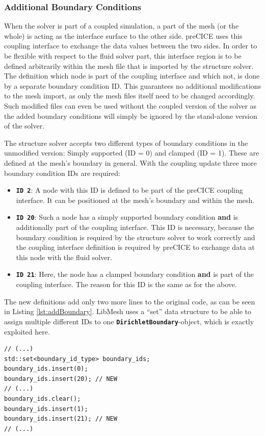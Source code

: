   \subsubsection{Additional Boundary Conditions}\label{sec:Coupl-Impl-BCs}
   When the solver is part of a coupled simulation, a part of the mesh (or the whole) is acting as the interface surface to the other side. preCICE uses this coupling interface to exchange the data values between the two sides. In order to be flexible with respect to the fluid solver part, this interface region is to be defined arbitrarily within the mesh file that is imported by the structure solver. The definition which node is part of the coupling interface and which not, is done by a separate boundary condition ID. This guarantees no additional modifications to the mesh import, as only the mesh files itself need to be changed accordingly. Such modified files can even be used without the coupled version of the solver as the added boundary conditions will simply be ignored by the stand-alone version of the solver.
   
   The structure solver accepts two different types of boundary conditions in the unmodified version: Simply supported (ID = 0) and clamped (ID = 1). These are defined at the mesh's boundary in general. With the coupling update three more boundary condition IDs are required:
   \begin{itemize}
  	\item \textbf{\texttt{ID 2}}: A node with this ID is defined to be part of the preCICE coupling interface. It can be positioned at the mesh's boundary and within the mesh.
  	\item \textbf{\texttt{ID 20}}: Such a node has a simply supported boundary condition \textbf{and} is additionally part of the coupling interface. This ID is necessary, because the boundary condition is required by the structure solver to work correctly and the coupling interface definition is required by preCICE to exchange data at this node with the fluid solver.
  	\item \textbf{\texttt{ID 21}}: Here, the node has a clamped boundary condition \textbf{and} is part of the coupling interface. The reason for this ID is the same as for the above.
   \end{itemize}
   
   The new definitions add only two more lines to the original code, as can be seen in Listing \ref{lst:addBoundary}. LibMesh uses a ``set'' data structure to be able to assign multiple different IDs to one \texttt{\textbf{DirichletBoundary}}-object, which is exactly exploited here.
\begin{lstlisting}[caption=Additional boundary condition IDs,label=lst:addBoundary,keepspaces=true]
// (...)
std::set<boundary_id_type> boundary_ids;
boundary_ids.insert(0);
boundary_ids.insert(20); // NEW
// (...)
boundary_ids.clear();
boundary_ids.insert(1);
boundary_ids.insert(21); // NEW
// (...)
\end{lstlisting}

